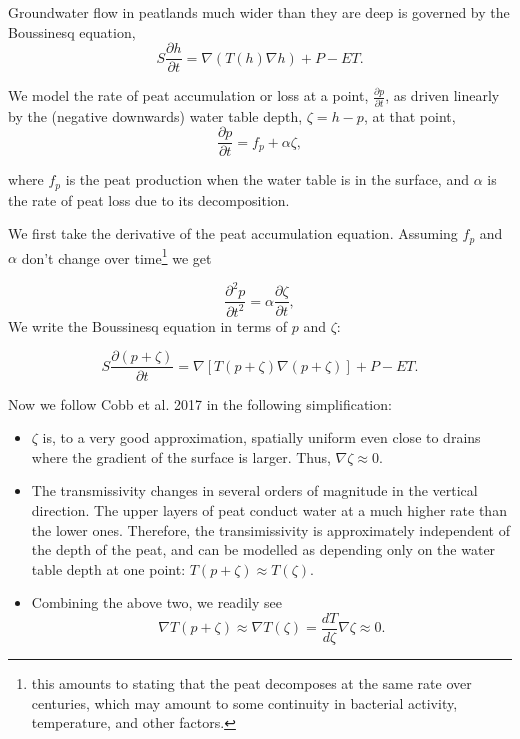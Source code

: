 \documentclass[10pt]{article}
\begin{document}
Groundwater flow in peatlands much wider than they are deep is governed by the Boussinesq equation,
$$
S\frac{\partial h}{\partial t} = \nabla \left(T(h) \nabla h\right) + P-ET.
$$

We model the rate of peat accumulation or loss at a point, $\frac{\partial p}{\partial t}$, as driven linearly by the (negative downwards) water table depth, $\zeta=h-p$, at that point,
$$
\frac{\partial p}{\partial t} = f_p + \alpha \zeta,
$$

\noindent where $f_p$ is the peat production when the water table is in the surface, and $\alpha$ is the rate of peat loss due to its decomposition.

We first take the derivative of the peat accumulation equation. Assuming $f_p$ and $\alpha$ don't change over time\footnote{this amounts to stating that the peat decomposes at the same rate over centuries, which may amount to some continuity in bacterial activity, temperature, and other factors.} we get

\begin{equation}
  \label{eq:d2p/dt}
\frac{\partial^2 p}{\partial t^2} = \alpha \frac{\partial \zeta}{\partial t},
\end{equation}
We write the Boussinesq equation in terms of $p$ and $\zeta$:

\begin{equation}
  \label{eq:boussi-p-zeta}
S\frac{\partial (p+\zeta)}{\partial t} = \nabla \left[T(p+\zeta) \nabla (p+\zeta)\right] + P-ET.
\end{equation}

Now we follow Cobb et al. 2017 in the following simplification:
\begin{itemize}
  \item $\zeta$ is, to a very good approximation, spatially uniform even close to drains where the gradient of the surface is larger. Thus, $\nabla \zeta \approx 0$.
\item The transmissivity changes in several orders of magnitude in the vertical direction. The upper layers of peat conduct water at a much higher rate than the lower ones. Therefore, the transimissivity is approximately independent of the depth of the peat, and can be modelled as depending only on the water table depth at one point: $T(p+\zeta) \approx T(\zeta)$.
\item Combining the above two, we readily see 
  $$
  \nabla T(p + \zeta) \approx \nabla T(\zeta) = \frac{dT}{d\zeta}\nabla\zeta \approx 0.
  $$
\end{itemize}
\end{document}

